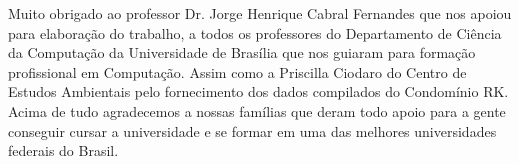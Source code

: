 Muito obrigado ao professor Dr. Jorge Henrique Cabral Fernandes que nos apoiou para elaboração do trabalho, a todos os professores do Departamento de Ciência da Computação da Universidade de Brasília que nos guiaram para formação profissional em Computação. Assim como a Priscilla Ciodaro do Centro de Estudos Ambientais pelo fornecimento dos dados compilados do Condomínio RK. Acima de tudo agradecemos a nossas famílias que deram todo apoio para a gente conseguir cursar a universidade e se formar em uma das melhores universidades federais do Brasil. 
